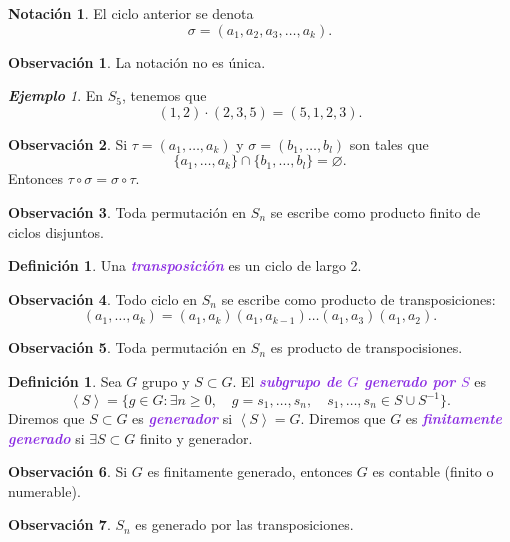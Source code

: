 \documentclass{article}
\theoremstyle{definition}
\newtheorem{definition}[theorem]{Definición}
\newtheorem*{notation}{Notación}
\newtheorem*{obs}{Observación}
\theoremstyle{remark}
\newtheorem{example}[theorem]{\textbf{Ejemplo}}
\numberwithin{equation}{section}
\renewcommand{\c}{\cdot}
\newcommand{\gen}[1]{\left\langle #1 \right\rangle}
\newcommand{\wea}[1]{\textcolor{BlueViolet}{\textbf{\emph{#1}}}}
\begin{document}
\begin{notation}
  El ciclo anterior se denota
  \[\sigma = (a_1,a_2,a_3,\dots,a_k).\]
\end{notation}

\begin{obs}
  La notación no es única.
\end{obs}

\begin{example}
  En $S_5$, tenemos que
  \[(1,2)\c(2,3,5) = (5,1,2,3).\]
\end{example}

\begin{obs}
  Si $\tau = (a_1,\dots,a_k)$ y $\sigma = (b_1,\dots,b_l)$ son tales que
  \[\{a_1,\dots,a_k\} \cap \{b_1,\dots,b_l\} = \varnothing.\]
  Entonces $\tau \circ \sigma = \sigma \circ \tau$.
\end{obs}

\begin{obs}
  Toda permutación en $S_n$ se escribe como producto finito de ciclos disjuntos.
\end{obs}

\begin{definition}
  Una \wea{transposición} es un ciclo de largo 2.
\end{definition}

\begin{obs}
  Todo ciclo en $S_n$ se escribe como producto de transposiciones:
  \[(a_1,\dots,a_k) = (a_1,a_k)(a_1,a_{k-1}) \dots (a_1,a_3)(a_1,a_2).\]
\end{obs}

\begin{obs}
  Toda permutación en $S_n$ es producto de transpocisiones.
\end{obs}

\begin{definition}
  Sea $G$ grupo y $S \subset G$. El \wea{subgrupo de $G$ generado por $S$} es
  \[\gen{S} = \{g \in G : \exists n \geq 0, \quad g = s_1,\dots,s_n, \quad s_1,\dots,s_n \in S \cup S^{-1}\}.\]
  Diremos que $S \subset G$ es \wea{generador} si $\gen{S} = G$.
  Diremos que $G$ es \wea{finitamente generado} si $\exists S \subset G$ finito y generador.
\end{definition}

\begin{obs}
  Si $G$ es finitamente generado, entonces $G$ es contable (finito o numerable).
\end{obs}

\begin{obs}
  $S_n$ es generado por las transposiciones.
\end{obs}
\end{document}
